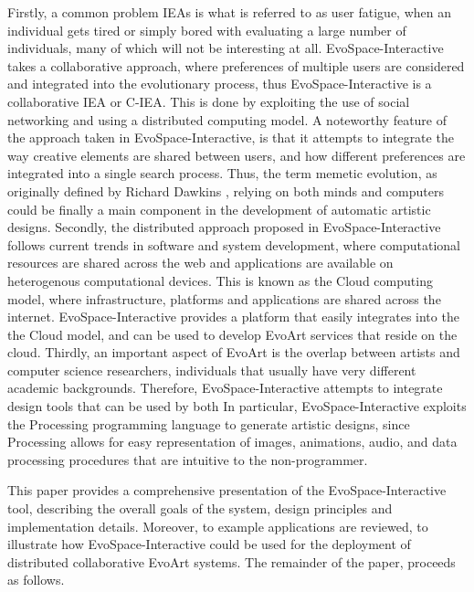 \documentclass{sig-alternate}
\begin{document}
Firstly, a common problem IEAs is what is referred to as user fatigue, when an individual gets tired or simply bored with evaluating a large number of individuals,
many of which will not be interesting at all.
EvoSpace-Interactive takes a collaborative approach, where preferences of multiple users are considered and integrated into the evolutionary process,
thus EvoSpace-Interactive is a collaborative IEA or C-IEA.
This is done by exploiting the use of social networking and using a distributed computing model.
A noteworthy feature of the approach taken in EvoSpace-Interactive, is that it attempts to integrate the way creative elements are shared between users,
and how different preferences are integrated into a single search process.
Thus, the term memetic evolution, as originally defined by Richard Dawkins \cite{r.dawkins1976the-selfish-gen}, relying on both minds and computers
could be finally a main component in the development of automatic artistic designs.
Secondly, the distributed approach proposed in EvoSpace-Interactive follows current trends in software and system development,
where computational resources are shared across the web and applications are available on heterogenous computational devices.
This is known as the Cloud computing model, where infrastructure, platforms and applications are shared across the internet.
EvoSpace-Interactive provides a platform that easily integrates into the the Cloud model, and can be used to develop EvoArt services that reside on the cloud.
Thirdly, an important aspect of EvoArt is the overlap between artists and computer science researchers, individuals that usually have very different
academic backgrounds. Therefore, EvoSpace-Interactive attempts to integrate design tools that can be used by both
In particular, EvoSpace-Interactive exploits the Processing programming language to generate artistic designs,
since Processing allows for easy representation of images, animations, audio, and data processing procedures that are intuitive to the non-programmer.


This paper provides a comprehensive presentation of the EvoSpace-Interactive tool, describing the overall goals of the system,
design principles and implementation details.
Moreover, to example applications are reviewed, to illustrate how EvoSpace-Interactive could be used for the deployment of distributed collaborative EvoArt systems.
The remainder of the paper, proceeds as follows.
\end{document}
